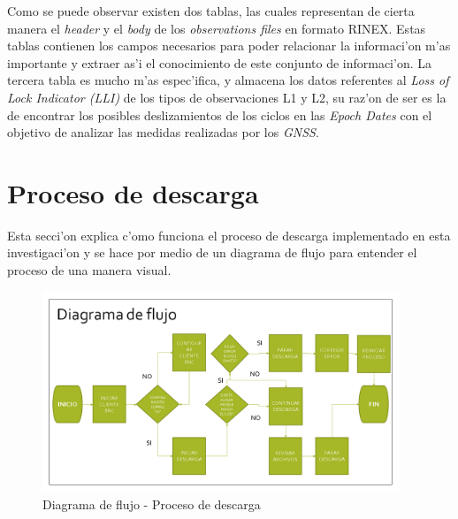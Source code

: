 Como se puede observar existen dos tablas, las cuales representan de cierta manera el \emph{header} y el \emph{body} de los \emph{observations files} en formato RINEX. Estas tablas contienen los campos necesarios para poder relacionar la informaci'on m'as importante y extraer as'i el conocimiento de este conjunto de informaci'on. La tercera tabla es mucho m'as espec'ifica, y almacena los datos referentes al \emph{Loss of Lock Indicator (LLI)} de los tipos de observaciones L1 y L2, su raz'on de ser es la de encontrar los posibles deslizamientos de los ciclos en las \emph{Epoch Dates} con el objetivo de analizar las medidas realizadas por los \emph{GNSS}.

\section{Proceso de descarga}
\noindent
Esta secci'on explica c'omo funciona el proceso de descarga implementado en esta investigaci'on y se hace por medio de un diagrama de flujo para entender el proceso de una manera visual.

\begin{figure}[H]
\centering
\includegraphics[width=0.95\textwidth]{images/Proceso_de_descarga}
\caption{Diagrama de flujo - Proceso de descarga}
\label{fig:4.11}
\end{figure}

\clearpage